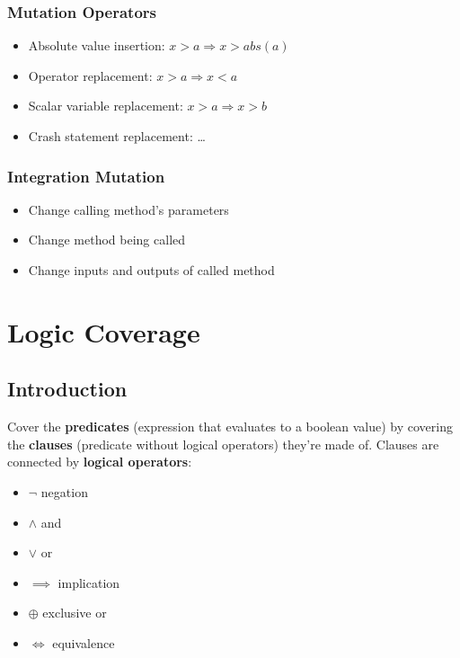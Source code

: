 \documentclass[]{article}
\theoremstyle{definition}
\begin{document}
				\subsubsection{Mutation Operators}
					\begin{itemize}
						\item Absolute value insertion: $x > a \Rightarrow x > abs(a)$
						\item Operator replacement: $x > a \Rightarrow x < a$
						\item Scalar variable replacement: $x > a \Rightarrow x > b$
						\item Crash statement replacement: \dots
					\end{itemize}
				\subsubsection{Integration Mutation}
					\begin{itemize}
						\item Change calling method's parameters
						\item Change method being called
						\item Change inputs and outputs of called method
					\end{itemize}

							

		\section{Logic Coverage}
		\subsection{Introduction}
		Cover the \textbf{predicates} (expression that evaluates to a boolean value) by covering the \textbf{clauses} (predicate without logical operators) they're made of. 
		Clauses are connected by \textbf{logical operators}:
		\begin{multicols}{3}
			\begin{itemize}
				\item $\neg$ negation
				\item $\wedge$ and
				\item $\lor$ or
				\item $\implies$ implication
				\item $\oplus$ exclusive or
				\item $\iff$ equivalence
			\end{itemize}
		\end{multicols}
\end{document}
